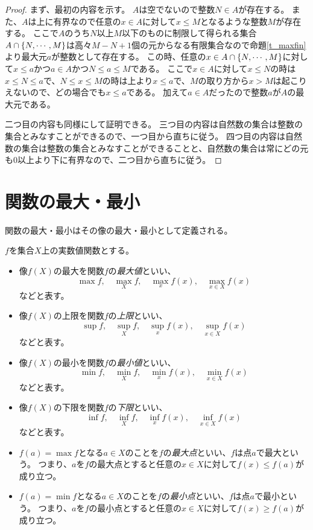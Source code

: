 \begin{proof}
まず、最初の内容を示す。
$A$は空でないので整数$N \in A$が存在する。
また、$A$は上に有界なので任意の$x \in A$に対して$x \le M$となるような整数$M$が存在する。
ここで$A$のうち$N$以上$M$以下のものに制限して得られる集合$A\cap\{ N, \cdots, M \}$は高々$M-N+1$個の元からなる有限集合なので命題\ref{t_maxfin}より最大元$a$が整数として存在する。
この時、任意の$x \in A\cap\{ N, \cdots, M \}$に対して$x \le a$かつ$a \in A$かつ$N \le a \le M$である。
ここで$x \in A$に対して$x \le N$の時は$x \le N \le a$で、$N \le x \le M$の時は上より$x \le a$で、$M$の取り方から$x > M$は起こりえないので、どの場合でも$x \le a$である。
加えて$a \in A$だったので整数$a$が$A$の最大元である。

二つ目の内容も同様にして証明できる。
三つ目の内容は自然数の集合は整数の集合とみなすことができるので、一つ目から直ちに従う。
四つ目の内容は自然数の集合は整数の集合とみなすことができることと、自然数の集合は常にどの元も$0$以上より下に有界なので、二つ目から直ちに従う。
\end{proof}

\section{関数の最大・最小}

関数の最大・最小はその像の最大・最小として定義される。

\begin{definition}[関数の最大・最小・上限・下限]
$f$を集合$X$上の実数値関数とする。
\begin{itemize}
\item
像$f(X)$の最大を関数$f$の\emph{最大値}といい、
$$
\max f, \quad \max_X f, \quad \max_x f(x), \quad \max_{x \in X}f(x)
$$
などと表す。
\item
像$f(X)$の上限を関数$f$の\emph{上限}といい、
$$
\sup f, \quad \sup_X f, \quad \sup_x f(x), \quad \sup_{x \in X}f(x)
$$
などと表す。
\item
像$f(X)$の最小を関数$f$の\emph{最小値}といい、
$$
\min f, \quad \min_X f, \quad \min_x f(x), \quad \min_{x \in X}f(x)
$$
などと表す。
\item
像$f(X)$の下限を関数$f$の\emph{下限}といい、
$$
\inf f, \quad \inf_X f, \quad \inf_x f(x), \quad \inf_{x \in X}f(x)
$$
などと表す。
\item
$f(a) = \max f$となる$a \in X$のことを$f$の\emph{最大点}といい、$f$は点$a$で最大という。
つまり、$a$を$f$の最大点とすると任意の$x \in X$に対して$f(x) \le f(a)$が成り立つ。
\item
$f(a) = \min f$となる$a \in X$のことを$f$の\emph{最小点}といい、$f$は点$a$で最小という。
つまり、$a$を$f$の最小点とすると任意の$x \in X$に対して$f(x) \ge f(a)$が成り立つ。
\end{itemize}
\end{definition}


